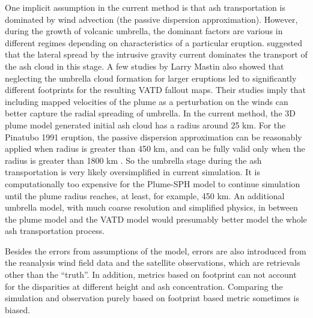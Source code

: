 \documentclass[utf8]{frontiersSCNS} %
\begin{document}
One implicit assumption in the current method is that ash transportation is dominated by wind advection (the passive dispersion approximation). However, during the growth of volcanic umbrella, the dominant factors are various in different regimes \citep{pouget2016interpretation} depending on characteristics of a particular eruption. \citet{webster2020operational} suggested that the lateral spread by the intrusive gravity current dominates the transport of the ash cloud in this stage. A few studies by Larry Mastin \citep{mastin2014modeling,mastin2020comparing} also showed that neglecting the umbrella cloud formation for larger eruptions led to significantly different footprints for the resulting VATD fallout maps. Their studies imply that including mapped velocities of the plume as a perturbation on the winds can better capture the radial spreading of umbrella. In the current method, the 3D plume model generated initial ash cloud has a radius around 25 km. For the Pinatubo 1991 eruption, the passive dispersion approximation can be reasonably applied when radius is greater than 450 km, and can be fully valid only when the radius is greater than 1800 km \citep{costa2013density}. So the umbrella stage during the ash transportation is very likely oversimplified in current simulation. It is computationally too expensive for the Plume-SPH model to continue simulation until the plume radius reaches, at least, for example, 450 km. An additional umbrella model, with much coarse resolution and simplified physics, in between the plume model and the VATD model would presumably better model the whole ash transportation process.

Besides the errors from assumptions of the model, errors are also introduced from the reanalysis wind field data and the satellite observations, which are retrievals other than the ``truth”. In addition, metrics based on footprint can not account for the disparities at different height and ash concentration. Comparing the simulation and observation purely based on footprint based metric sometimes is biased.
\end{document}
